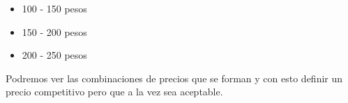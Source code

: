 
\begin{itemize}
    \item 100 - 150 pesos
    \item 150 - 200 pesos
    \item 200 - 250 pesos
\end{itemize}

Podremos ver las combinaciones de precios que se forman y con esto definir un precio competitivo pero que a la vez sea aceptable.